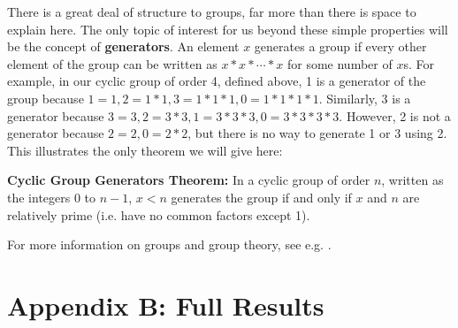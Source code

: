 \documentclass[man,mask,10pt]{apa6}
\begin{document}
There is a great deal of structure to groups, far more than there is space to explain here. The only topic of interest for us beyond these simple properties will be the concept of \textbf{generators}. An element $x$ generates a group if every other element of the group can be written as $x*x*\cdots*x$ for some number of $x$s. For example, in our cyclic group of order 4, defined above, 1 is a generator of the group because $1 = 1, 2 = 1 * 1, 3 = 1 * 1 * 1, 0 = 1 * 1 * 1 * 1$. Similarly, 3 is a generator because $3 = 3, 2 = 3 * 3, 1 = 3 * 3 * 3, 0 = 3 * 3 * 3 * 3$. However, 2 is not a generator because $2 = 2, 0 = 2 * 2$, but there is no way to generate 1 or 3 using 2. This illustrates the only theorem we will give here: \par
\textbf{Cyclic Group Generators Theorem:} In a cyclic group of order $n$, written as the integers $0$ to $n-1$, $x < n$ generates the group if and only if $x$ and $n$ are relatively prime (i.e. have no common factors except 1). \par 
For more information on groups and group theory, see e.g. \cite{Lang2002}.
\onecolumn
\clearpage
\section{Appendix B: Full Results}
\end{document}
